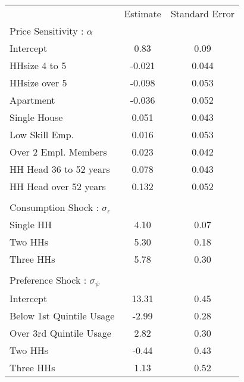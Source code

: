 \begin{tabular}{lcc}
& Estimate & Standard Error \\
Price Sensitivity : $\alpha$ & \multicolumn{2}{c}{}\\
\hline
Intercept &0.83&0.09\\
HHsize 4 to 5 &-0.021&0.044\\
HHsize over 5 &-0.098&0.053\\
Apartment &-0.036&0.052\\
Single House &0.051&0.043\\
Low Skill Emp. &0.016&0.053\\
Over 2 Empl. Members &0.023&0.042\\
HH Head 36 to 52 years  &0.078&0.043\\
HH Head over 52 years  &0.132&0.052\\
\multicolumn{3}{c}{} \\
Consumption Shock : $\sigma_{\epsilon}$ & \multicolumn{2}{c}{}\\
\hline
Single HH &4.10&0.07\\
Two HHs &5.30&0.18\\
Three HHs &5.78&0.30\\
\multicolumn{3}{c}{} \\
Preference Shock : $\sigma_{\psi}$ & \multicolumn{2}{c}{}\\
\hline
Intercept &13.31&0.45\\
Below 1st Quintile Usage &-2.99&0.28\\
Over 3rd Quintile Usage &2.82&0.30\\
Two HHs &-0.44&0.43\\
Three HHs &1.13&0.52\\
\hline
\end{tabular} 
